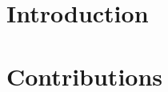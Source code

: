 \cleardoublepage

\cleardoublepage

\cleardoublepage

\pagestyle{scrheadings}

\cleardoublepage

\cleardoublepage



\cleardoublepage


\part{Introduction}

\cleardoublepage


\part{Contributions}

\cleardoublepage

